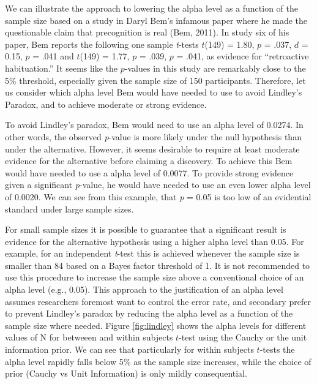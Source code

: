 \documentclass[
  english,
  ,jou, a4paper,floatsintext]{apa6}
\begin{document}
We can illustrate the approach to lowering the alpha level as a function of the sample size based on a study in Daryl Bem's infamous paper where he made the questionable claim that precognition is real (Bem, 2011). In study six of his paper, Bem reports the following one sample \emph{t}-tests \(t\)(149) = 1.80, \(p\) = .037, \(d\) = 0.15, \(p\) = .041 and \(t\)(149) = 1.77, \(p\) = .039, \(p\) = .041, as evidence for ``retroactive habituation.'' It seems like the \(p\)-values in this study are remarkably close to the 5\% threshold, especially given the sample size of 150 participants. Therefore, let us consider which alpha level Bem would have needed to use to avoid Lindley's Paradox, and to achieve moderate or strong evidence.

To avoid Lindley's paradox, Bem would need to use an alpha level of 0.0274. In other words, the observed \emph{p}-value is more likely under the null hypothesis than under the alternative. However, it seems desirable to require at least moderate evidence for the alternative before claiming a discovery. To achieve this Bem would have needed to use a alpha level of 0.0077. To provide strong evidence given a significant \emph{p}-value, he would have needed to use an even lower alpha level of 0.0020. We can see from this example, that \emph{p} = 0.05 is too low of an evidential standard under large sample sizes.

For small sample sizes it is possible to guarantee that a significant result is evidence for the alternative hypothesis using a higher alpha level than 0.05. For example, for an independent \emph{t}-test this is achieved whenever the sample size is smaller than 84 based on a Bayes factor threshold of 1. It is not recommended to use this procedure to increase the sample size above a conventional choice of an alpha level (e.g., 0.05). This approach to the justification of an alpha level assumes researchers foremost want to control the error rate, and secondary prefer to prevent Lindley's paradox by reducing the alpha level as a function of the sample size where needed. Figure \ref{fig:lindley} shows the alpha levels for different values of N for betweeen and within subjects \(t\)-test using the Cauchy or the unit information prior. We can see that particularly for within subjects \(t\)-tests the alpha level rapidly falls below 5\% as the sample size increases, while the choice of prior (Cauchy vs Unit Information) is only mildly consequential.
\end{document}
